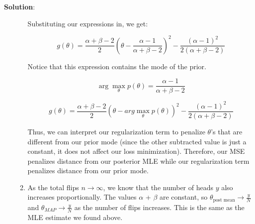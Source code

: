 \documentclass[submit]{../harvardml}
\newenvironment{answer}{
    \vspace{2mm}
    \color{blue}\noindent\textbf{Solution}:
}{}
\begin{document}
\begin{answer}
\begin{enumerate}
\begin{enumerate}
              Substituting our expressions in, we get:

              \[
              g(\theta) = \frac{\alpha + \beta -2}{2}\left(\theta - \frac{\alpha - 1}{\alpha + \beta -2}\right)^2 - \frac{(\alpha - 1)^2}{2(\alpha + \beta -2)}
              \]

              Notice that this expression contains the mode of the prior.

              \[\arg\max_\theta p(\theta) = \frac{\alpha-1}{\alpha+\beta-2}\]

              \[
              g(\theta) = \frac{\alpha + \beta -2}{2}\left(\theta - arg\max_\theta p(\theta)\right)^2 - \frac{(\alpha - 1)^2}{2(\alpha + \beta -2)}
              \]

              Thus, we can interpret our regularization term to penalize $\theta$'s that are different from our prior mode (since the other subtracted value is just a constant, it does not affect our loss minimization). Therefore, our MSE penalizes distance from our posterior MLE while our regularization term penalizes distance from our prior mode.

        \item As the total flips $n \to \infty$, we know that the number of heads $y$ also increases proportionally. The values $\alpha$ + $\beta$ are constant, so $\theta_{\text{post mean}} \to \frac{y}{N}$ and $\theta_{MAP} \to \frac{y}{N}$ as the number of flips increases. This is the same as the MLE estimate we found above.

      \end{enumerate}

  \end{enumerate}
\end{answer}


\newpage

\end{document}
